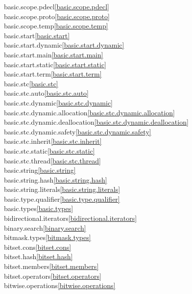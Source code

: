 \begin{multicols}{2}
basic.scope.pdecl\quad\ref{basic.scope.pdecl}\\
basic.scope.proto\quad\ref{basic.scope.proto}\\
basic.scope.temp\quad\ref{basic.scope.temp}\\
basic.start\quad\ref{basic.start}\\
basic.start.dynamic\quad\ref{basic.start.dynamic}\\
basic.start.main\quad\ref{basic.start.main}\\
basic.start.static\quad\ref{basic.start.static}\\
basic.start.term\quad\ref{basic.start.term}\\
basic.stc\quad\ref{basic.stc}\\
basic.stc.auto\quad\ref{basic.stc.auto}\\
basic.stc.dynamic\quad\ref{basic.stc.dynamic}\\
basic.stc.dynamic.allocation\quad\ref{basic.stc.dynamic.allocation}\\
basic.stc.dynamic.deallocation\quad\ref{basic.stc.dynamic.deallocation}\\
basic.stc.dynamic.safety\quad\ref{basic.stc.dynamic.safety}\\
basic.stc.inherit\quad\ref{basic.stc.inherit}\\
basic.stc.static\quad\ref{basic.stc.static}\\
basic.stc.thread\quad\ref{basic.stc.thread}\\
basic.string\quad\ref{basic.string}\\
basic.string.hash\quad\ref{basic.string.hash}\\
basic.string.literals\quad\ref{basic.string.literals}\\
basic.type.qualifier\quad\ref{basic.type.qualifier}\\
basic.types\quad\ref{basic.types}\\
bidirectional.iterators\quad\ref{bidirectional.iterators}\\
binary.search\quad\ref{binary.search}\\
bitmask.types\quad\ref{bitmask.types}\\
bitset.cons\quad\ref{bitset.cons}\\
bitset.hash\quad\ref{bitset.hash}\\
bitset.members\quad\ref{bitset.members}\\
bitset.operators\quad\ref{bitset.operators}\\
bitwise.operations\quad\ref{bitwise.operations}\\

\end{multicols}
